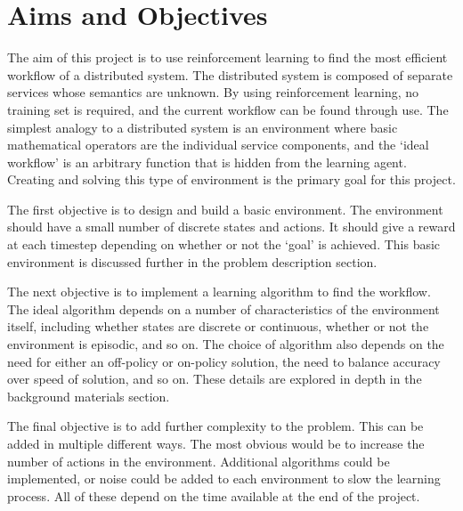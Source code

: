 \chapter{Aims and Objectives}
\begin{comment}

use RL to learn the most efficient workflow of a distributed system composed of separate services, whose actions are unknown. By using RL, no training set is required, and the correct workflow can be found through use.

To model a distributed system an environment will be made that uses basic mathematical operators as components, there will be a 'correct workflow' e.g initial value $+3.5/2$, and the algorithms will test warious combinations of these services to get the desired results. 

The objectives are to build these environments of different levels of detail, and implementing different algorithms to find these functions.
\end{comment}
The aim of this project is to use reinforcement learning to find the most efficient workflow of a distributed system. The distributed system is composed of separate services whose semantics are unknown. By using reinforcement learning, no training set is required, and the current workflow can be found through use. The simplest analogy to a distributed system is an environment where basic mathematical operators are the individual service components, and the `ideal workflow' is an arbitrary function that is hidden from the learning agent. Creating and solving this type of environment is the primary goal for this project.

The first objective is to design and build a basic environment. The environment should have a small number of discrete states and actions. It should give a reward at each timestep depending on whether or not the `goal' is achieved. This basic environment is discussed further in the problem description section.

The next objective is to implement a learning algorithm to find the workflow. The ideal algorithm depends on a number of characteristics of the environment itself, including whether states are discrete or continuous, whether or not the environment is episodic, and so on. The choice of algorithm also depends on the need for either an off-policy or on-policy solution, the need to balance accuracy over speed of solution, and so on. These details are explored in depth in the background materials section.

The final objective is to add further complexity to the problem. This can be added in multiple different ways. The most obvious would be to increase the number of actions in the environment. Additional algorithms could be implemented, or noise could be added to each environment to slow the learning process. All of these depend on the time available at the end of the project.


